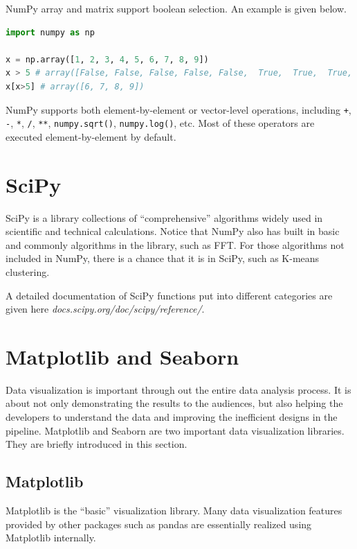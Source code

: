 NumPy array and matrix support boolean selection. An example is given below.
\begin{lstlisting}[language=Python]
import numpy as np

x = np.array([1, 2, 3, 4, 5, 6, 7, 8, 9])
x > 5 # array([False, False, False, False, False,  True,  True,  True,  True])
x[x>5] # array([6, 7, 8, 9])
\end{lstlisting}

NumPy supports both element-by-element or vector-level operations, including \verb|+|, \verb|-|, \verb|*|, \verb|/|, \verb|**|, \verb|numpy.sqrt()|, \verb|numpy.log()|, etc. Most of these operators are executed element-by-element by default.

\section{SciPy}

SciPy is a library collections of ``comprehensive'' algorithms widely used in scientific and technical calculations. Notice that NumPy also has built in basic and commonly algorithms in the library, such as FFT. For those algorithms not included in NumPy, there is a chance that it is in SciPy, such as K-means clustering.

A detailed documentation of SciPy functions put into different categories are given here \textit{docs.scipy.org/doc/scipy/reference/}.

\section{Matplotlib and Seaborn}

Data visualization is important through out the entire data analysis process. It is about not only demonstrating the results to the audiences, but also helping the developers to understand the data and improving the inefficient designs in the pipeline. Matplotlib and Seaborn are two important data visualization libraries. They are briefly introduced in this section.

\subsection{Matplotlib}

Matplotlib is the ``basic'' visualization library. Many data visualization features provided by other packages such as pandas are essentially realized using Matplotlib internally.

